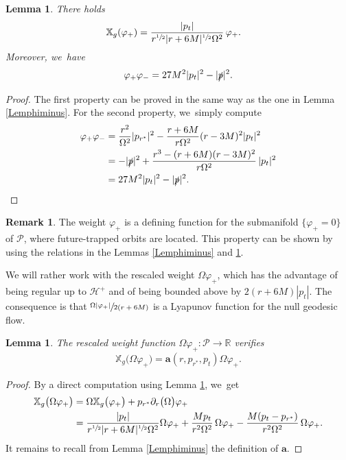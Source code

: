 \documentclass[JEP,XML,SOM,Unicode,published]{cedram}
\theoremstyle{plain}
\newtheorem{lemma}[proposition]{Lemma}
\theoremstyle{definition}
\newtheorem{remark}[proposition]{Remark}
\newcommand\R{{\mathbb{R}}}
\newcommand\T{{\mathbb{X}}}
\begin{document}
\begin{lemma}\label{lemmavarphiplus}
There holds\vspace*{-3pt}
\begin{align*}
\T_g(\varphi_+)&= \frac{ |p_t|}{r^{\sfrac{1}{2}}|r+6M|^{\sfrac{1}{2}} \Omega^2}\,\varphi_{+}.
\end{align*}
Moreover, we~have
\[
\varphi_+ \varphi_- = 27M^2|p_t|^2-|\slashed{p}|^2.
\]
\end{lemma}

\begin{proof}
The first property can be proved in the same way as the one in Lemma \ref{Lemphiminus}. For the second property, we~simply compute
\begin{align*}
\varphi_+ \varphi_- & = \frac{r^2 }{\Omega^2} |p_{r^*}|^2 -\frac{r+6M}{r\Omega^2}(r-3M)^2|p_t|^2\\
&=-|\slashed{p}|^2+\frac{r^3-(r+6M)(r-3M)^2}{r\Omega^2}\,|p_t|^2 \\
& =27M^2|p_t|^2-|\slashed{p}|^2.\qedhere
\end{align*}
\end{proof}

\begin{remark}
The weight $\varphi_+$ is a defining function for the submanifold $\{\varphi_+=0\}$ of $\mathcal{P}$, where future-trapped orbits are located. This property can be shown by using the relations in the Lemmas \ref{Lemphiminus} and \ref{lemmavarphiplus}.
\end{remark}

We will rather work with the rescaled weight $\Omega\varphi_+$, which has the advantage of being regular up to $\mathcal{H}^+$ and of being bounded above by $2(r+6M)|p_t|$. The consequence is that $\sfrac{\Omega|\varphi_+|}{2(r+6M)}$ is a Lyapunov function for the null geodesic flow.

\begin{lemma}\label{LemOmvarplus}
The rescaled weight function $\Omega \varphi_+ \colon \mathcal{P}\to \R$ verifies\vspace*{-3pt}
\[
\T_g \bigl(\Omega \varphi_+ \bigr)= \pmb{a}(r,p_{r^*},p_t)\Omega\varphi_+.
\]
\end{lemma}

\begin{proof}
By a direct computation using Lemma \ref{lemmavarphiplus}, we~get\vspace*{-3pt}
\begin{align*}
\T_g \bigl(\Omega \varphi_+ \bigr)&= \Omega \T_g \bigl(\varphi_+ \bigr)+p_{r^*} \partial_r \bigl(\Omega \bigr) \varphi_+ \\
& = \frac{ |p_t|}{r^{\sfrac{1}{2}}|r+6M|^{\sfrac{1}{2}} \Omega^2} \Omega\varphi_{+}+\frac{Mp_t}{r^2 \Omega^2}\, \Omega \varphi_+ -\frac{M(p_t-p_{r^*})}{r^2 \Omega^2}\, \Omega \varphi_+.
\end{align*}
It remains to recall from Lemma \ref{Lemphiminus} the definition of $\pmb{a}$.
\end{proof}
\end{document}
